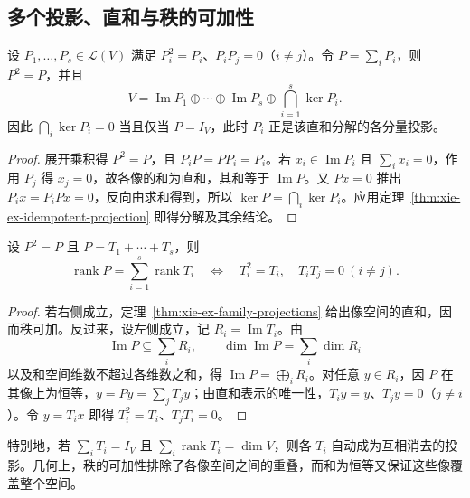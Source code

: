 \subsection{多个投影、直和与秩的可加性}

\begin{theorem}
\label{thm:xie-ex-family-projections}
设 $P_1,\ldots,P_s\in\mathcal L(V)$ 满足 $P_i^2=P_i$、$P_iP_j=0$（$i\ne j$）。令 $P=\sum_iP_i$，则 $P^2=P$，并且
\begin{equation}
\label{eq:xie-ex-family-projections}
    V=\operatorname{Im}P_1\oplus\cdots\oplus\operatorname{Im}P_s
    \oplus\bigcap_{i=1}^{s}\ker P_i.
\end{equation}
因此 $\bigcap_i\ker P_i=0$ 当且仅当 $P=I_V$，此时 $P_i$ 正是该直和分解的各分量投影。
\end{theorem}

\begin{proof}
展开乘积得 $P^2=P$，且 $P_iP=PP_i=P_i$。若 $x_i\in\operatorname{Im}P_i$ 且 $\sum_ix_i=0$，作用 $P_j$ 得 $x_j=0$，故各像的和为直和，其和等于 $\operatorname{Im}P$。又 $Px=0$ 推出 $P_ix=P_iPx=0$，反向由求和得到，所以 $\ker P=\bigcap_i\ker P_i$。应用定理~\ref{thm:xie-ex-idempotent-projection} 即得分解及其余结论。
\end{proof}

\begin{theorem}
\label{thm:xie-ex-idempotent-rank-additivity}
设 $P^2=P$ 且 $P=T_1+\cdots+T_s$，则
\begin{equation}
\label{eq:xie-ex-idempotent-rank-additivity}
    \operatorname{rank}P=\sum_{i=1}^{s}\operatorname{rank}T_i
    \quad\Longleftrightarrow\quad
    T_i^2=T_i,\quad T_iT_j=0\ (i\ne j).
\end{equation}
\end{theorem}

\begin{proof}
若右侧成立，定理~\ref{thm:xie-ex-family-projections} 给出像空间的直和，因而秩可加。反过来，设左侧成立，记 $R_i=\operatorname{Im}T_i$。由
\[
    \operatorname{Im}P\subseteq\sum_iR_i,\qquad
    \dim\operatorname{Im}P=\sum_i\dim R_i
\]
以及和空间维数不超过各维数之和，得 $\operatorname{Im}P=\bigoplus_iR_i$。对任意 $y\in R_i$，因 $P$ 在其像上为恒等，$y=Py=\sum_jT_jy$；由直和表示的唯一性，$T_iy=y$、$T_jy=0$（$j\ne i$）。令 $y=T_ix$ 即得 $T_i^2=T_i$、$T_jT_i=0$。
\end{proof}

特别地，若 $\sum_iT_i=I_V$ 且 $\sum_i\operatorname{rank}T_i=\dim V$，则各 $T_i$ 自动成为互相消去的投影。几何上，秩的可加性排除了各像空间之间的重叠，而和为恒等又保证这些像覆盖整个空间。

